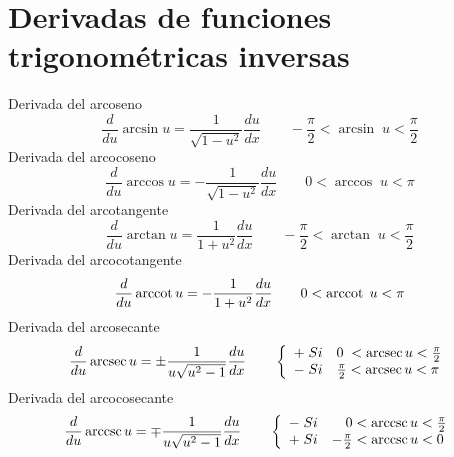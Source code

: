 \section{Derivadas de funciones trigonométricas inversas}
Derivada del arcoseno
\begin{equation}
	\frac{d}{du} \arcsin u = \frac{1}{\sqrt{1-u^2}}\frac{du}{dx}\qquad -\frac{\pi}{2} < \arcsin\; u < \frac{\pi}{2}
\end{equation}
Derivada del arcocoseno
\begin{equation}
	\frac{d}{du} \arccos u = -\frac{1}{\sqrt{1-u^2}}\frac{du}{dx}\qquad 0 < \arccos\; u < \pi
\end{equation}
Derivada del arcotangente
\begin{equation}
	\frac{d}{du} \arctan u = \frac{1}{1+u^2}\frac{du}{dx}\qquad -\frac{\pi}{2} < \arctan\; u < \frac{\pi}{2}
\end{equation}
Derivada del arcocotangente
\begin{equation}
	\frac{d}{du} \operatorname{arccot} u = -\frac{1}{1+u^2}\frac{du}{dx}\qquad 0 < \operatorname{arccot}\; u < \pi
\end{equation}
Derivada del arcosecante
\begin{equation}
	\frac{d}{du} \operatorname{arcsec} u = \pm \frac{1}{u\sqrt{u^2-1}}\frac{du}{dx}\qquad\left\{
	\begin{array}{ll}
		+\; Si  & 0\; < \operatorname{arcsec} u < \frac{\pi}{2}  \\
		-\; Si  & \frac{\pi}{2} < \operatorname{arcsec} u < \pi
	\end{array}
	\right.
\end{equation}
Derivada del arcocosecante
\begin{equation}
	\frac{d}{du} \operatorname{arccsc} u = \mp \frac{1}{u\sqrt{u^2-1}}\frac{du}{dx}\qquad\left\{
	\begin{array}{ll}
		-\; Si  & \quad 0 < \operatorname{arccsc} u < \frac{\pi}{2}  \\
		+\; Si  & -\frac{\pi}{2} < \operatorname{arccsc} u < 0
	\end{array}
	\right.
\end{equation}

